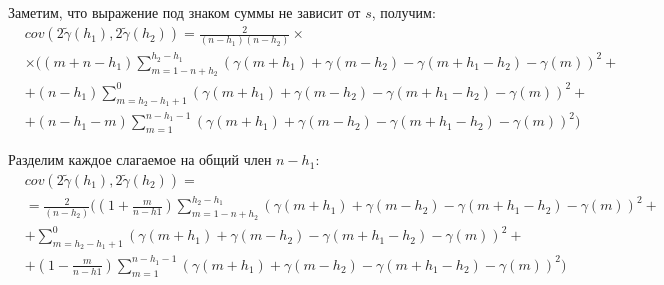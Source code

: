 Заметим, что выражение под знаком суммы не зависит от $s$, получим:
\begin{eqnarray*}
\nonumber
	& cov(2 \tilde{\gamma}(h_1), 2 \tilde{\gamma}(h_2)) = \frac{2}{(n - h_1) (n - h_2)} \times \\
	& \times ((m + n - h_1)\sum_{m = 1 - n + h_2}^{h_2 - h_1}(\gamma(m + h_1) + \gamma(m - h_2) - \gamma(m + h_1 - h_2) - \gamma(m))^2 + \\
	& + (n - h_1)\sum_{m = h_2 - h_1 + 1}^{0}(\gamma(m + h_1) + \gamma(m - h_2) - \gamma(m + h_1 - h_2) - \gamma(m))^2 + \\
	& + (n - h_1 - m)\sum_{m = 1}^{n - h_1 - 1}(\gamma(m + h_1) + \gamma(m - h_2) - \gamma(m + h_1 - h_2) - \gamma(m))^2)
\end{eqnarray*}

Разделим каждое слагаемое на общий член $n - h_1$:
\begin{eqnarray*}
\nonumber
	& cov(2 \tilde{\gamma}(h_1), 2 \tilde{\gamma}(h_2)) = \\ 
	& = \frac{2}{(n - h_2)} ((1 + \frac{m}{n - h1})\sum_{m = 1 - n + h_2}^{h_2 - h_1}(\gamma(m + h_1) + \gamma(m - h_2) - \gamma(m + h_1 - h_2) - \gamma(m))^2 + \\
	& + \sum_{m = h_2 - h_1 + 1}^{0}(\gamma(m + h_1) + \gamma(m - h_2) - \gamma(m + h_1 - h_2) - \gamma(m))^2 + \\
	& + (1 - \frac{m}{n - h1})\sum_{m = 1}^{n - h_1 - 1}(\gamma(m + h_1) + \gamma(m - h_2) - \gamma(m + h_1 - h_2) - \gamma(m))^2)
\end{eqnarray*}

\label{sec:variogram_theory}


